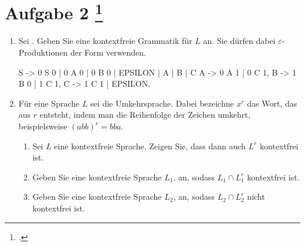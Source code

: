 \documentclass{lehramt-informatik-aufgabe}
\begin{document}
\section{Aufgabe 2
\footcite{66115:2020:09}}

\begin{enumerate}


\item Sei . Geben Sie eine kontextfreie Grammatik für $L$
an. Sie dürfen dabei $\varepsilon$-Produktionen der Form
 verwenden.

\begin{liAntwort}
\begin{liProduktionsRegeln}
S -> 0 S 0 | 0 A 0 | 0 B 0 | EPSILON | A | B | C
A -> 0 A 1 | 0 C 1,
B -> 1 B 0 | 1 C 1,
C -> 1 C 1 | EPSILON,
\end{liProduktionsRegeln}
\end{liAntwort}


\item Für eine Sprache $L$ sei  die
Umkehrsprache. Dabei bezeichne $x^r$ das Wort, das aus $r$ entsteht,
indem man die Reihenfolge der Zeichen umkehrt, beispielsweise $(abb)^r =
bba$.

\begin{enumerate}


\item Sei $L$ eine kontextfreie Sprache. Zeigen Sie, dass dann auch
$L^r$ kontextfrei ist.


\item Geben Sie eine kontextfreie Sprache $L_1$, an, sodass $L_1 \cap
L^r_1$ kontextfrei ist.


\item Geben Sie eine kontextfreie Sprache $L_2$, an, sodass $L_2 \cap
L^r_2$ nicht kontextfrei ist.

\end{enumerate}
\end{enumerate}
\end{document}
